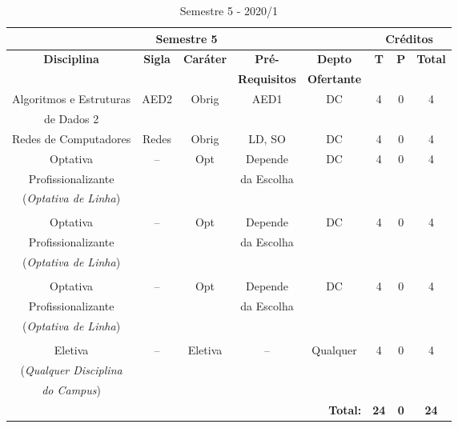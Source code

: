 \begin{table}[H]
\caption{Semestre 5 - 2020/1}
\centering
\footnotesize
\begin{tabular}{|c|c|c|c|c|c|c|c|} %
\hline
\hline
\multicolumn{5}{|c|}{\textbf{Semestre 5}}  &  \multicolumn{3}{|c|}{\textbf{Créditos}} \\
\hline
\hline
\textbf{Disciplina} & \textbf{Sigla} & \textbf{Caráter} & \textbf{Pré-} & \textbf{Depto} &  \textbf{T}  &  \textbf{P}  & \textbf{Total} \\ 
& & & \textbf{Requisitos}  & \textbf{Ofertante} & & & \\
\hline 

Algoritmos e Estruturas & AED2 & Obrig & AED1 & DC  & 4 & 0 & 4 \\
de Dados 2 & & & & & & & \\
\hline

Redes de Computadores & Redes & Obrig & LD, SO & DC & 4 & 0 & 4 \\
\hline

Optativa & --  & Opt & Depende & DC  & 4 & 0 & 4 \\
Profissionalizante & & & da Escolha & & & & \\
(\textit{Optativa de Linha}) & & & & & & & \\
 & & & & & & & \\
\hline

Optativa & --  & Opt & Depende & DC  & 4 & 0 & 4 \\
Profissionalizante & & & da Escolha & & & & \\
(\textit{Optativa de Linha}) & & & & & & & \\
 & & & & & & & \\
\hline

Optativa & --  & Opt & Depende & DC  & 4 & 0 & 4 \\
Profissionalizante & & & da Escolha & & & & \\
(\textit{Optativa de Linha}) & & & & & & & \\
 & & & & & & & \\
\hline
Eletiva  & --  & Eletiva & -- & Qualquer & 4 & 0 & 4 \\
(\textit{Qualquer Disciplina} & & & & & & & \\
\textit{do Campus}) & & & & & & & \\
\hline

\hline
\multicolumn{5}{|r|}{\textbf{Total:}}  &  \textbf{24}  &  \textbf{0}   & \textbf{24} \\ %
\hline
\hline
\end{tabular}
\label{tab:matriz3m}
\end{table}


